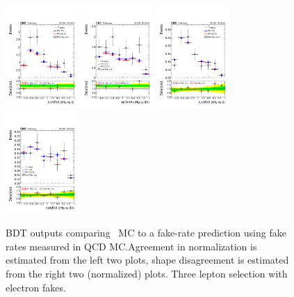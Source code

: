 \begin{figure}[htb]
 \centering
 \includegraphics[width=0.245\textwidth]{figures/FR_closures/thqMVA_tt_3l_elfake_norm.pdf} 
 \includegraphics[width=0.245\textwidth]{figures/FR_closures/thqMVA_ttv_3l_elfake_norm.pdf} 
 \includegraphics[width=0.245\textwidth]{figures/FR_closures/thqMVA_tt_3l_elfake_shape.pdf} 
 \includegraphics[width=0.245\textwidth]{figures/FR_closures/thqMVA_ttv_3l_elfake_shape.pdf} \\
\caption{BDT outputs comparing \ttbar\ MC to a fake-rate prediction using fake rates measured in QCD MC.\@ Agreement in normalization is estimated from the left two plots, shape disagreement is estimated from the right two (normalized) plots. Three lepton selection with electron fakes.} 
\label{fig:frclosure_3l_elfake}
\end{figure} 

